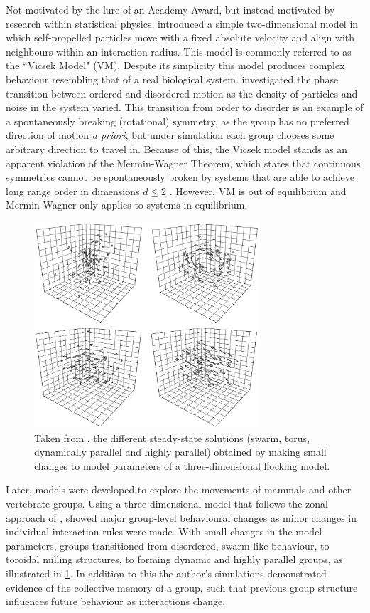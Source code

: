 Not motivated by the lure of an Academy Award, but instead motivated by
research within statistical physics, \textcite{vicsek95} introduced a simple
two-dimensional model in which self-propelled particles move with a fixed
absolute velocity and align with neighbours within an interaction radius. This
model is commonly referred to as the ``Vicsek Model" (VM). Despite its
simplicity this model produces complex behaviour resembling that of a real
biological system. \textcite{vicsek95} investigated the phase transition
between ordered and disordered motion as the density of particles and noise in
the system varied. This transition from order to disorder is an example of a
spontaneously breaking (rotational) symmetry, as the group has no preferred
direction of motion \emph{a priori}, but under simulation each group chooses
some arbitrary direction to travel in. Because of this, the Vicsek model stands
as an apparent violation of the Mermin-Wagner Theorem, which states that
continuous symmetries cannot be spontaneously broken by systems that are able
to achieve long range order in dimensions $d\leq 2$ \parencite{mermin66}.
However, VM is out of equilibrium and Mermin-Wagner only applies to systems in
equilibrium.

\begin{figure}[tb]
	\includegraphics[width=0.75\textwidth]{couzin.png}
    \caption{Taken from \textcite{couzin02}, the different steady-state
    solutions (swarm, torus, dynamically parallel and highly parallel) obtained
    by making small changes to model parameters of a three-dimensional flocking
    model.}
	\label{fig:couzin}
\end{figure}

Later, models were developed to explore the movements of mammals and other
vertebrate groups. Using a three-dimensional model that follows the zonal
approach of \textcite{aoki82}, \textcite{couzin02} showed major group-level
behavioural changes as minor changes in individual interaction rules were made.
With small changes in the model parameters, groups transitioned from
disordered, swarm-like behaviour, to toroidal milling structures, to forming
dynamic and highly parallel groups, as illustrated in \cref{fig:couzin}. In
addition to this the author's simulations demonstrated evidence of the
collective memory of a group, such that previous group structure influences
future behaviour as interactions change.

